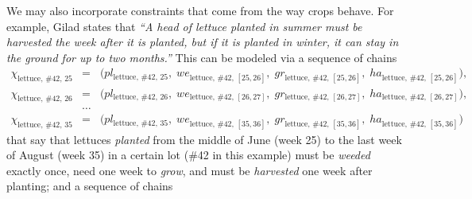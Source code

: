 \documentclass[11pt,reqno]{amsart}
\numberwithin{equation}{section}
\begin{document}
We may also incorporate constraints that come from the way crops behave. For example,
Gilad states that \emph{``A head of lettuce planted in summer must be harvested
  the week after it is planted, but if it is planted in winter, it can stay in the ground
  for up to two months.''} This can be modeled via a sequence of chains 
\begin{eqnarray*}
   \chi_{\text{lettuce},\, \text{\#42},\, 25} 
   &=& 
   \big(
      pl_{\text{lettuce},\, \text{\#42},\, 25}, \; 
      we_{\text{lettuce},\, \text{\#42},\, [25,26]}, \;
      gr_{\text{lettuce},\, \text{\#42},\, [25,26]}, \;
      ha_{\text{lettuce},\, \text{\#42},\, [25,26]}
      \big), \\
   \chi_{\text{lettuce},\, \text{\#42},\, 26} 
   &=& 
   \big(
      pl_{\text{lettuce},\, \text{\#42},\, 26}, \; 
      we_{\text{lettuce},\, \text{\#42},\, [26,27]}, \;
      gr_{\text{lettuce},\, \text{\#42},\, [26,27]}, \;
      ha_{\text{lettuce},\, \text{\#42},\, [26,27]}
      \big), \\
   &\dots& \\
   \chi_{\text{lettuce},\, \text{\#42},\, 35} 
   &=& 
   \big(
      pl_{\text{lettuce},\, \text{\#42},\, 35}, \; 
      we_{\text{lettuce},\, \text{\#42},\, [35,36]}, \;
      gr_{\text{lettuce},\, \text{\#42},\, [35,36]}, \;
      ha_{\text{lettuce},\, \text{\#42},\, [35,36]}
      \big)
\end{eqnarray*}
that say that lettuces \emph{planted} from the middle of June (week 25) to the last week
of August (week 35) in a certain lot (\#42 in this example) must be \emph{weeded} exactly
once, need one week to \emph{grow}, and must be \emph{harvested} one week after planting;
and a sequence of chains
\end{document}
